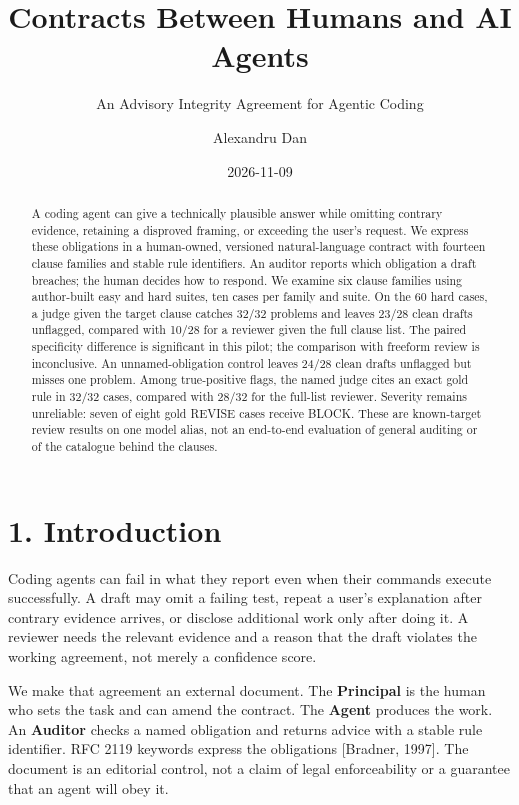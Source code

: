 \documentclass[
  10pt,
  a4paper,
]{article}
\title{Contracts Between Humans and AI Agents}
\subtitle{An Advisory Integrity Agreement for Agentic Coding}
\author{Alexandru Dan}
\date{2026-11-09}
\begin{document}
\maketitle
\begin{abstract}
A coding agent can give a technically plausible answer while omitting
contrary evidence, retaining a disproved framing, or exceeding the
user's request. We express these obligations in a human-owned, versioned
natural-language contract with fourteen clause families and stable rule
identifiers. An auditor reports which obligation a draft breaches; the
human decides how to respond. We examine six clause families using
author-built easy and hard suites, ten cases per family and suite. On
the 60 hard cases, a judge given the target clause catches 32/32
problems and leaves 23/28 clean drafts unflagged, compared with 10/28
for a reviewer given the full clause list. The paired specificity
difference is significant in this pilot; the comparison with freeform
review is inconclusive. An unnamed-obligation control leaves 24/28 clean
drafts unflagged but misses one problem. Among true-positive flags, the
named judge cites an exact gold rule in 32/32 cases, compared with 28/32
for the full-list reviewer. Severity remains unreliable: seven of eight
gold REVISE cases receive BLOCK. These are known-target review results
on one model alias, not an end-to-end evaluation of general auditing or
of the catalogue behind the clauses.
\end{abstract}

\section{1. Introduction}\label{introduction}

Coding agents can fail in what they report even when their commands
execute successfully. A draft may omit a failing test, repeat a user's
explanation after contrary evidence arrives, or disclose additional work
only after doing it. A reviewer needs the relevant evidence and a reason
that the draft violates the working agreement, not merely a confidence
score.

We make that agreement an external document. The \textbf{Principal} is
the human who sets the task and can amend the contract. The
\textbf{Agent} produces the work. An \textbf{Auditor} checks a named
obligation and returns advice with a stable rule identifier. RFC 2119
keywords express the obligations {[}Bradner, 1997{]}. The document is an
editorial control, not a claim of legal enforceability or a guarantee
that an agent will obey it.
\end{document}
